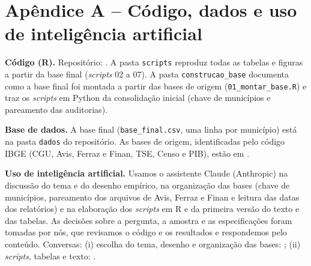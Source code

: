 

\section*{Apêndice A -- Código, dados e uso de inteligência artificial}

\noindent\textbf{Código (R).} Repositório: . A pasta \texttt{scripts}
reproduz todas as tabelas e figuras a partir da base final (\textit{scripts} 02 a 07). A pasta
\texttt{construcao\_base} documenta como a base final foi montada a partir das bases de origem
(\texttt{01\_montar\_base.R}) e traz os \textit{scripts} em Python da consolidação inicial (chave de
municípios e pareamento das auditorias).

\smallskip
\noindent\textbf{Base de dados.} A base final (\texttt{base\_final.csv}, uma linha por município) está na
pasta \texttt{dados} do repositório. As bases de origem, identificadas pelo código IBGE (CGU, Avis, Ferraz
e Finan, TSE, Censo e PIB), estão em .

\smallskip
\noindent\textbf{Uso de inteligência artificial.} Usamos o assistente Claude (Anthropic) na discussão do
tema e do desenho empírico, na organização das bases (chave de municípios, pareamento dos arquivos de Avis,
Ferraz e Finan e leitura das datas dos relatórios) e na elaboração dos \textit{scripts} em R e da primeira
versão do texto e das tabelas. As decisões sobre a pergunta, a amostra e as especificações foram tomadas
por nós, que revisamos o código e os resultados e respondemos pelo conteúdo. Conversas: (i) escolha do
tema, desenho e organização das bases: ; (ii) \textit{scripts},
tabelas e texto: .


